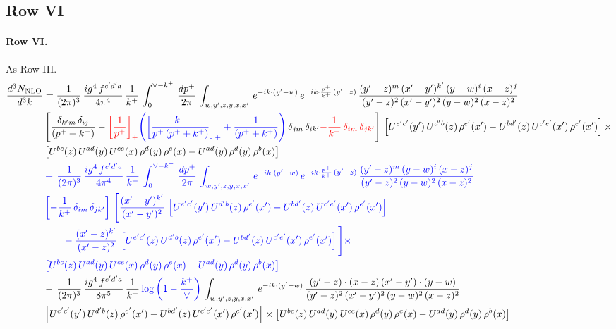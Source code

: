 \documentclass[10pt]{article}
\numberwithin{equation}{section}
\newcommand{\new}[1]{{\color{blue}#1}}
\newcommand{\old}[1]{{\color{red}#1}}
\newcommand{\nc}{\color{blue}}
\begin{document}
\subsection{Row VI}
\paragraph{Row VI.}
As Row III.
\begin{align}
    \frac{d^{3}N_{\rm NLO}}{d^{3}k} & =  \frac{1}{(2\pi)^{3}}\, \frac{ig^{4}\,f^{c'd'a}}{4\pi^{4}}\, \frac{1}{k^{+}}\,\int_{0}^{\vee-k^{+}}\, \frac{dp^{+}}{2\pi}\, \int_{w,y',z,y,x,x'}\, e^{-ik\cdot (y'-w)}\, e^{-ik\cdot \frac{p^{+}}{k^{+}}\,(y'-z)}\,\frac{(y'-z)^{m}\,(x'-y')^{k'}\,(y-w)^{i}\,(x-z)^{j}}{(y'-z)^{2}\,(x'-y')^{2}\,(y-w)^{2}\,(x-z)^{2}}\notag \\ & \left[\frac{\delta_{k'm}\,\delta_{ij}}{(p^{+}+k^{+})}-\old{\left[\frac{1}{p^{+}}\right]_{+}}\new{\left(\left[\frac{k^{+}}{p^{+}\,(p^{+}+k^{+})}\right]_{+}+\frac{1}{(p^{+}+k^{+})}\right)}\,\delta_{jm}\,\delta_{ik'}\old{-\frac{1}{k^{+}}\, \delta_{im}\, \delta_{jk'}}\right]\, \left[U^{e'c'}(y')\,U^{d'b}(z)\,\rho^{e'}(x')-U^{bd'}(z)\,U^{c'e'}(x')\,\rho^{e'}(x')\right]\times\notag \\ &  \left[U^{bc}(z)\,U^{ad}(y)\,U^{ce}(x)\,\rho^{d}(y)\,\rho^{e}(x)-U^{ad}(y)\,\rho^{d}(y)\,\rho^{b}(x)\right] \notag \\
& \nc  +\,\frac{1}{(2\pi)^{3}}\, \frac{ig^{4}\,f^{c'd'a}}{4\pi^{4}}\, \frac{1}{k^{+}}\,\int_{0}^{\vee-k^{+}}\, \frac{dp^{+}}{2\pi}\, \int_{w,y',z,y,x,x'}\, e^{-ik\cdot (y'-w)}\, e^{-ik\cdot \frac{p^{+}}{k^{+}}\,(y'-z)}\,\frac{(y'-z)^{m}\,(y-w)^{i}\,(x-z)^{j}}{(y'-z)^{2}\,(y-w)^{2}\,(x-z)^{2}}\notag \\ & \nc  \left[-\frac{1}{k^{+}}\, \delta_{im}\, \delta_{jk'}\right]\, \Bigg[\frac{(x'-y')^{k'}}{(x'-y')^{2}}\,\left[U^{e'c'}(y')\,U^{d'b}(z)\,\rho^{e'}(x')-U^{bd'}(z)\,U^{c'e'}(x')\,\rho^{e'}(x')\right]\notag \\ & \nc  \qquad-\frac{(x'-z)^{k'}}{(x'-z)^{2}}\,\left[U^{e'c'}(z)\,U^{d'b}(z)\,\rho^{e'}(x')-U^{bd'}(z)\,U^{c'e'}(x')\,\rho^{e'}(x')\right]\Bigg]\times\notag \\ & \nc   \left[U^{bc}(z)\,U^{ad}(y)\,U^{ce}(x)\,\rho^{d}(y)\,\rho^{e}(x)-U^{ad}(y)\,\rho^{d}(y)\,\rho^{b}(x)\right] \notag \\
&  -\,\frac{1}{(2\pi)^{3}}\, \frac{ig^{4}\,f^{c'd'a}}{8\pi^{5}}\, \frac{1}{k^{+}}\,\new{\log{\left(1-\frac{k^{+}}{\vee}\right)}}\, \int_{w,y',z,y,x,x'}\, e^{-ik\cdot (y'-w)}\,\frac{(y'-z)\cdot (x-z)\,(x'-y')\cdot (y-w)}{(y'-z)^{2}\,(x'-y')^{2}\,(y-w)^{2}\,(x-z)^{2}}\notag \\ & \left[U^{e'c'}(y')\,U^{d'b}(z)\,\rho^{e'}(x')-U^{bd'}(z)\,U^{c'e'}(x')\,\rho^{e'}(x')\right]\times  \left[U^{bc}(z)\,U^{ad}(y)\,U^{ce}(x)\,\rho^{d}(y)\,\rho^{e}(x)-U^{ad}(y)\,\rho^{d}(y)\,\rho^{b}(x)\right] \label{eq:F:G3VI}
\end{align}
\end{document}

